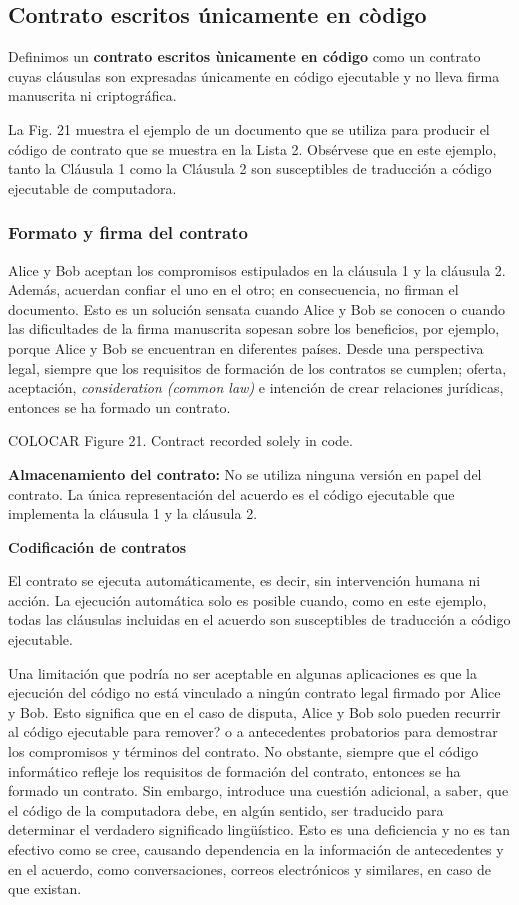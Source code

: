\documentclass[12pt]{report} %
\begin{document}
\begin{itemize}
\subsection{Contrato escritos únicamente en còdigo}

Definimos un \textbf{contrato escritos ùnicamente en código} como un contrato cuyas cláusulas son expresadas únicamente en código ejecutable y no lleva firma manuscrita ni criptográfica.

La Fig. 21 muestra el ejemplo de un documento que se utiliza para producir el código de contrato que se muestra en la Lista 2. Obsérvese que en este ejemplo, tanto la Cláusula 1 como la Cláusula 2 son susceptibles de traducción a código ejecutable de computadora.

\subsubsection{Formato y firma del contrato}

Alice y Bob aceptan los compromisos estipulados en la cláusula 1 y la cláusula 2. Además, acuerdan confiar el uno en el otro; en consecuencia, no firman el documento. Esto es un solución sensata cuando Alice y Bob se conocen o cuando las dificultades de la firma manuscrita sopesan sobre los beneficios, por ejemplo, porque Alice y Bob se encuentran en diferentes países. Desde una perspectiva legal, siempre que los requisitos de formación de los contratos se cumplen; oferta, aceptación, \textit{consideration (common law)} e intención de crear relaciones jurídicas, entonces se ha formado un contrato.

COLOCAR Figure 21. Contract recorded solely in code.

\textbf{Almacenamiento del contrato:} No se utiliza ninguna versión en papel del contrato. La única representación del acuerdo es el código ejecutable que implementa la cláusula 1 y la cláusula 2.

\textbf{Codificación de contratos}

El contrato se ejecuta automáticamente, es decir, sin intervención humana ni acción. La ejecución automática solo es posible cuando, como en este ejemplo, todas las cláusulas incluidas en el acuerdo son susceptibles de traducción a código ejecutable.

Una limitación que podría no ser aceptable en algunas aplicaciones es que la ejecución del código no está vinculado a ningún contrato legal firmado por Alice y Bob. Esto significa que en el caso de disputa, Alice y Bob solo pueden recurrir al código ejecutable para remover? o a antecedentes probatorios para demostrar los compromisos y términos del contrato. No obstante, siempre que el código informático refleje los requisitos de formación del contrato, entonces se ha formado un contrato. Sin embargo, introduce una cuestión adicional, a saber, que el código de la computadora debe, en algún sentido, ser traducido para determinar el verdadero significado lingüístico. Esto es una deficiencia y no es tan efectivo como se cree, causando  dependencia en la información de antecedentes y en el acuerdo, como conversaciones, correos electrónicos y similares, en caso de que existan.



\end{itemize}
\end{document}
